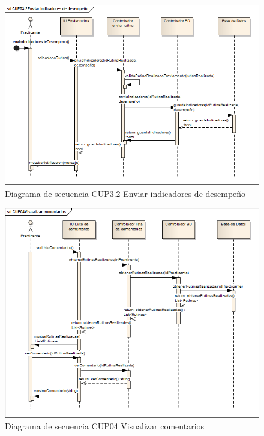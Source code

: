 \begin{figure}[H]
	\begin{center}
		\includegraphics[scale=0.6]{./Figuras/Secuencias/CUP03_2Enviar_indicadores_de_desempeno}
	\end{center}
	\caption{Diagrama de secuencia CUP3.2 Enviar indicadores de desempeño}
	\label{fig:SE_CUP032}
\end{figure}

\begin{figure}[H]
	\begin{center}
		\includegraphics[scale=0.7]{./Figuras/Secuencias/CUP04Visualizar_comentarios}
	\end{center}
	\caption{Diagrama de secuencia CUP04 Visualizar comentarios}
	\label{fig:SE_CUP04}
\end{figure}

